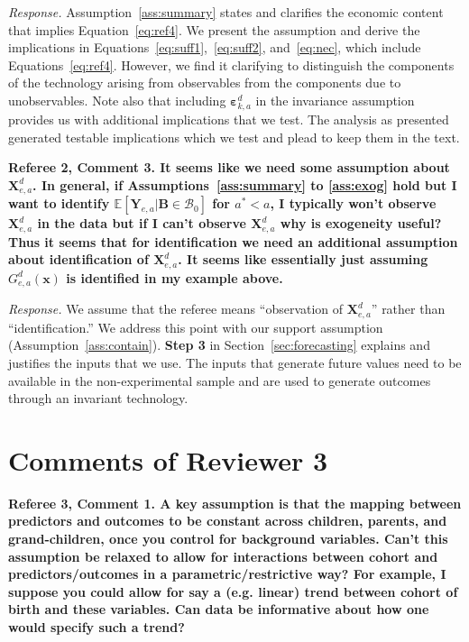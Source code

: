 \noindent \textit{Response.} Assumption~\ref{ass:summary} states and clarifies the economic content that implies Equation~\eqref{eq:ref4}. We present the assumption and derive the implications in Equations~\eqref{eq:suff1},~\eqref{eq:suff2}, and~\eqref{eq:nec},  which include Equations~\eqref{eq:ref4}. However, we find it clarifying to distinguish the components of the technology arising from observables from the components due to unobservables. Note also that including $\bm{\varepsilon}_{k,a}^d$ in the invariance assumption provides us with additional implications that we test. The analysis as presented generated testable implications which we test and plead to keep them in the text.

\noindent \textbf{Referee 2, Comment 3. It seems like we need some assumption about $\bm{X}_{e,a}^d$. In general, if Assumptions~\ref{ass:summary} to \ref{ass:exog} hold but I want to identify $\mathbb{E} \left[ \bm{Y}_{e,a} | \bm{B} \in \mathcal{B}_0 \right]$ for $a^* < a$, I typically won't observe $\bm{X}_{e,a}^d$ in the data but if I can't observe $\bm{X}_{e,a}^d$ why is exogeneity useful? Thus it seems that for identification we need an additional assumption about identification of $\bm{X}_{e,a}^d$. It seems like essentially just assuming $G_{e,a}^d \left( \bm{x} \right)$ is identified in my example above.} 

\noindent \textit{Response.} We assume that the referee means ``observation of $\bm{X}_{e,a}^d$'' rather than ``identification.'' We address this point with our support assumption (Assumption~\ref{ass:contain}). \textbf{Step 3} in Section~\ref{sec:forecasting} explains and justifies the inputs that we use. The inputs that generate future values need to be available in the non-experimental sample and are used to generate outcomes through an invariant technology. 

\section*{Comments of Reviewer 3}

\noindent \textbf{Referee 3, Comment 1. A key assumption is that the mapping between predictors and outcomes to be constant across children, parents, and grand-children, once you control for background variables. Can't this assumption be relaxed to allow for interactions between cohort and predictors/outcomes in a parametric/restrictive way? For example, I suppose you could allow for say a (e.g. linear) trend between cohort of birth and these variables. Can data be informative about how one would specify such a trend?}

